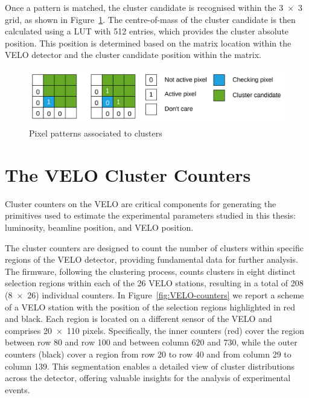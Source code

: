 Once a pattern is matched, the cluster candidate is recognised within the 3~×~3 grid, as shown in Figure~\ref{fig:cluster_recognition}. The centre-of-mass of the cluster candidate is then calculated using a LUT with 512 entries, which provides the cluster absolute position. This position is determined based on the matrix location within the VELO detector and the cluster candidate position within the matrix.

\begin{figure}[h]
    \centering
    \includegraphics[width=\textwidth]{figures/cluster_recognition.png}
    \caption{Pixel patterns associated to clusters}
    \label{fig:cluster_recognition}
\end{figure}

\section{The VELO Cluster Counters}\label{sec:velo_counters}
Cluster counters on the VELO are critical components for generating the primitives used to estimate the experimental parameters studied in this thesis: luminosity, beamline position, and VELO position. 

The cluster counters are designed to count the number of clusters within specific regions of the VELO detector, providing fundamental data for further analysis. The firmware, following the clustering process, counts clusters in eight distinct selection regions within each of the 26 VELO stations, resulting in a total of 208 (8~×~26) individual counters. In Figure~\ref{fig:VELO-counters} we report a scheme of a VELO station with the position of the selection regions highlighted in red and black. Each region is located on a different sensor of the VELO and comprises 20~×~110 pixels. Specifically, the inner counters (red) cover the region between row 80 and row 100 and between column 620 and 730, while the outer counters (black) cover a region from row 20 to row 40 and from column 29 to column 139. This segmentation enables a detailed view of cluster distributions across the detector, offering valuable insights for the analysis of experimental events.%


